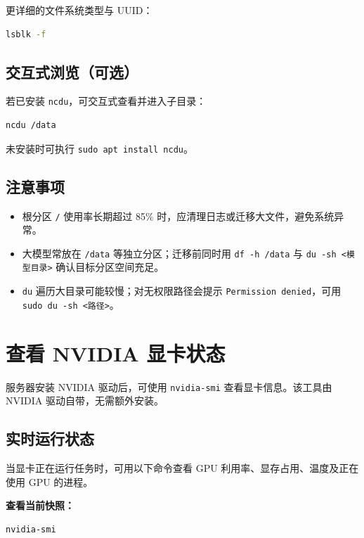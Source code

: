 更详细的文件系统类型与 UUID：

\begin{lstlisting}[language=sh]
lsblk -f
\end{lstlisting}

\subsection{交互式浏览（可选）}

若已安装 \texttt{ncdu}，可交互式查看并进入子目录：

\begin{lstlisting}[language=sh]
ncdu /data
\end{lstlisting}

未安装时可执行 \texttt{sudo apt install ncdu}。

\subsection{注意事项}

\begin{itemize}
    \item 根分区 \texttt{/} 使用率长期超过 85\% 时，应清理日志或迁移大文件，避免系统异常。
    \item 大模型常放在 \texttt{/data} 等独立分区；迁移前同时用 \texttt{df -h /data} 与 \texttt{du -sh <模型目录>} 确认目标分区空间充足。
    \item \texttt{du} 遍历大目录可能较慢；对无权限路径会提示 \texttt{Permission denied}，可用 \texttt{sudo du -sh <路径>}。
\end{itemize}

\section{查看 NVIDIA 显卡状态}

服务器安装 NVIDIA 驱动后，可使用 \texttt{nvidia-smi} 查看显卡信息。该工具由 NVIDIA 驱动自带，无需额外安装。

\subsection{实时运行状态}

当显卡正在运行任务时，可用以下命令查看 GPU 利用率、显存占用、温度及正在使用 GPU 的进程。

\textbf{查看当前快照：}

\begin{lstlisting}[language=sh]
nvidia-smi
\end{lstlisting}

